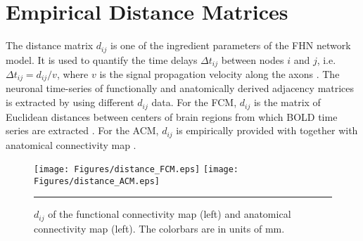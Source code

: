 
\chapter{Empirical Distance Matrices} %

\label{AppendixC} %


The distance matrix $d_{ij}$ is one of the ingredient parameters of the FHN network model. It is used to quantify the time delays $\Delta t_{ij}$ between nodes $i$ and $j$, i.e. $\Delta t_{ij} = d_{ij} / v$, where $v$ is the signal propagation velocity along the axons \citep{VUK13, GHO08a}. The neuronal time-series of functionally and anatomically derived adjacency matrices is extracted  by using different $d_{ij}$ data. For the FCM, $d_{ij}$ is the matrix of Euclidean distances between centers of brain regions from which BOLD time series are extracted \citep{KAI06}. For the ACM, $d_{ij}$ is empirically provided with together with anatomical connectivity map \citep{ITU08}. 



\begin{figure}[htbp]
 
  \centering
	 \texttt{[image: Figures/distance\_FCM.eps]}
	\texttt{[image: Figures/distance\_ACM.eps]}		
	\rule{35em}{0.5pt}  
  \caption[Distance Matrices]{$d_{ij}$ of the functional connectivity map (left) and anatomical connectivity map (left). The colorbars are in units of mm.} 
    \label{fig:Distance Matrices}
 	
\end{figure}
